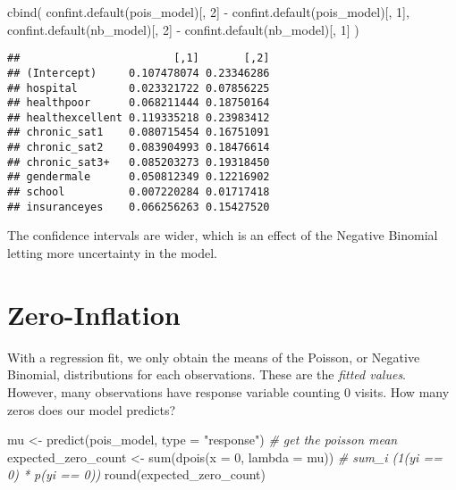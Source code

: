 \documentclass[
  oneside]{book}
\newenvironment{Shaded}{\begin{snugshade}}{\end{snugshade}}
\newcommand{\AttributeTok}[1]{\textcolor[rgb]{0.77,0.63,0.00}{#1}}
\newcommand{\CommentTok}[1]{\textcolor[rgb]{0.56,0.35,0.01}{\textit{#1}}}
\newcommand{\DecValTok}[1]{\textcolor[rgb]{0.00,0.00,0.81}{#1}}
\newcommand{\FunctionTok}[1]{\textcolor[rgb]{0.00,0.00,0.00}{#1}}
\newcommand{\NormalTok}[1]{#1}
\newcommand{\OtherTok}[1]{\textcolor[rgb]{0.56,0.35,0.01}{#1}}
\newcommand{\SpecialCharTok}[1]{\textcolor[rgb]{0.00,0.00,0.00}{#1}}
\newcommand{\StringTok}[1]{\textcolor[rgb]{0.31,0.60,0.02}{#1}}
\begin{document}
\begin{Shaded}
\begin{Highlighting}[]
\FunctionTok{cbind}\NormalTok{(}
  \FunctionTok{confint.default}\NormalTok{(pois\_model)[, }\DecValTok{2}\NormalTok{] }\SpecialCharTok{{-}} \FunctionTok{confint.default}\NormalTok{(pois\_model)[, }\DecValTok{1}\NormalTok{],}
  \FunctionTok{confint.default}\NormalTok{(nb\_model)[, }\DecValTok{2}\NormalTok{] }\SpecialCharTok{{-}} \FunctionTok{confint.default}\NormalTok{(nb\_model)[, }\DecValTok{1}\NormalTok{]}
\NormalTok{)}
\end{Highlighting}
\end{Shaded}

\begin{verbatim}
##                        [,1]       [,2]
## (Intercept)     0.107478074 0.23346286
## hospital        0.023321722 0.07856225
## healthpoor      0.068211444 0.18750164
## healthexcellent 0.119335218 0.23983412
## chronic_sat1    0.080715454 0.16751091
## chronic_sat2    0.083904993 0.18476614
## chronic_sat3+   0.085203273 0.19318450
## gendermale      0.050812349 0.12216902
## school          0.007220284 0.01717418
## insuranceyes    0.066256263 0.15427520
\end{verbatim}

The confidence intervals are wider, which is an effect of the Negative Binomial
letting more uncertainty in the model.

\hypertarget{zero-inflation}{%
\section{Zero-Inflation}\label{zero-inflation}}

With a regression fit, we only obtain the means of the Poisson, or Negative Binomial,
distributions for each observations. These are the \emph{fitted values}. However,
many observations have response variable counting 0 visits.
How many zeros does our model predicts?

\begin{Shaded}
\begin{Highlighting}[]
\NormalTok{mu }\OtherTok{\textless{}{-}} \FunctionTok{predict}\NormalTok{(pois\_model, }\AttributeTok{type =} \StringTok{"response"}\NormalTok{) }\CommentTok{\# get the poisson mean}
\NormalTok{expected\_zero\_count }\OtherTok{\textless{}{-}} \FunctionTok{sum}\NormalTok{(}\FunctionTok{dpois}\NormalTok{(}\AttributeTok{x =} \DecValTok{0}\NormalTok{, }\AttributeTok{lambda =}\NormalTok{ mu)) }\CommentTok{\# sum\_i (1(yi == 0) * p(yi == 0))}
\FunctionTok{round}\NormalTok{(expected\_zero\_count)}
\end{Highlighting}
\end{Shaded}
\end{document}
